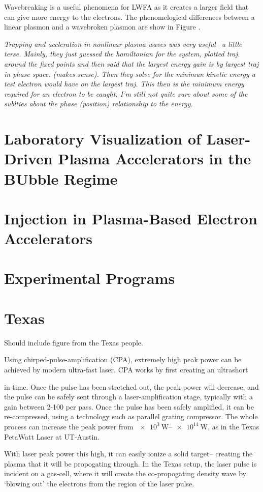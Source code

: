 \documentclass[12pt, titlepage]{caesar_book}
\begin{document}
Wavebreaking is a useful phenomena for LWFA as it creates a larger field that can give more energy to the electrons. The phenomelogical differences between a linear plasmon and a wavebroken plasmon are show in Figure .

{\em Trapping and accleration in nonlinear plasma waves was very useful-- a little terse. Mainly, they just guessed the hamiltonian for the system, plotted traj. around the fixed points and then said that the largest energy gain is by largest traj in phase space. (makes sense). Then they solve for the minimun kinetic energy a test electron would have on the largest traj. This then is the minimum energy required for an electron to be caught. I'm still not quite sure about some of the sublties about the phase (position) relationship to the energy.}

\section{Laboratory Visualization of Laser-Driven Plasma Accelerators in the BUbble Regime}
\section{Injection in Plasma-Based Electron Accelerators}
\section{Experimental Programs}
\section{Texas}
Should include figure from the Texas people. 

Using chirped-pulse-amplification (CPA), extremely high peak power can be achieved by modern ultra-fast laser. CPA works by first creating an ultrashort

in time. Once the pulse has been stretched out, the peak power will decrease, and the pulse can be safely sent through a laser-amplification stage, typically with a gain between 2-100 per pass. Once the pulse has been safely amplified, it can be re-compressed, using a technology such as parallel grating compressor.
The whole process can increase the peak power from $\SIrange{e3}{e14}{\watt}$, as
in the Texas PetaWatt Laser at UT-Austin.

With laser peak power this high, it can easily ionize a solid target-- creating
the plasma that it will be propogating through. In the Texas setup, the laser pulse is incident on a gas-cell, where it will create the co-propogating density wave by `blowing out' the electrons from the region of the laser pulse.
\end{document}
